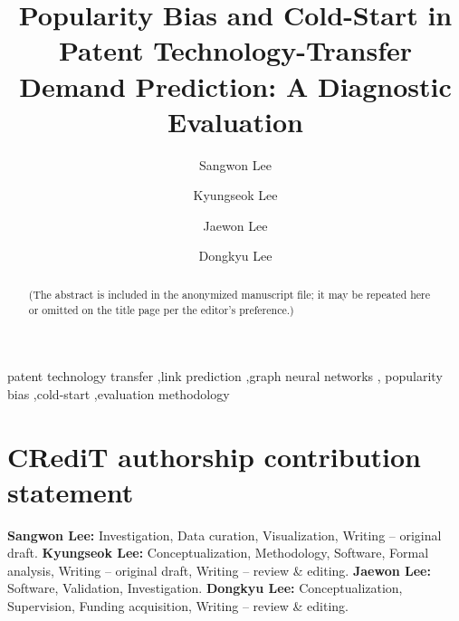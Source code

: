 \documentclass[preprint,12pt]{elsarticle}
\begin{document}
\begin{frontmatter}

\title{Popularity Bias and Cold-Start in Patent Technology-Transfer
Demand Prediction: A Diagnostic Evaluation}

\author[hyis]{Sangwon Lee}
\author[hyme]{Kyungseok Lee}
\author[hyme]{Jaewon Lee}
\author[lg]{Dongkyu Lee}





\begin{abstract}
(The abstract is included in the anonymized manuscript file; it may be repeated
here or omitted on the title page per the editor's preference.)
\end{abstract}

\begin{keyword}
patent technology transfer \sep link prediction \sep graph neural networks \sep
popularity bias \sep cold-start \sep evaluation methodology
\end{keyword}

\end{frontmatter}

\section*{CRediT authorship contribution statement}
\textbf{Sangwon Lee:} Investigation, Data curation, Visualization,
Writing -- original draft.
\textbf{Kyungseok Lee:} Conceptualization, Methodology, Software, Formal analysis,
Writing -- original draft, Writing -- review \& editing.
\textbf{Jaewon Lee:} Software, Validation, Investigation.
\textbf{Dongkyu Lee:} Conceptualization, Supervision, Funding acquisition,
Writing -- review \& editing.
\end{document}
